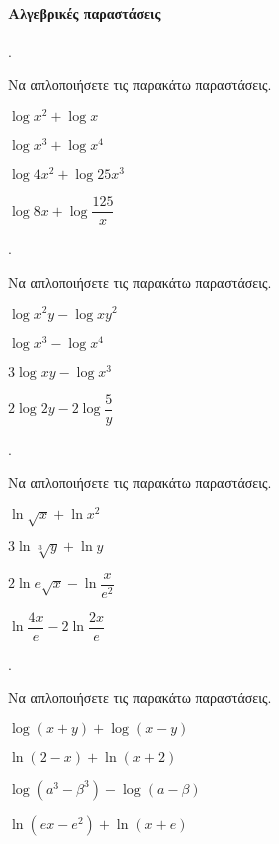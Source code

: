 \documentclass[11pt,a4paper,twocolumn]{article}
\newcounter{askhsh}
\newcommand{\askhsh}{{\large\theaskhsh.}\ \addtocounter{askhsh}{1}}
\begin{document}
\paragraph{Αλγεβρικές παραστάσεις}
\askhsh Να απλοποιήσετε τις παρακάτω παραστάσεις.
\begin{multicols}{2}
\begin{alist}
\item $ \log{x^2}+\log{x} $
\item $ \log{x^3}+\log{x^4} $
\item $ \log{4x^2}+\log{25x^3} $
\item $ \log{8x}+\log{\dfrac{125}{x}} $
\end{alist}
\end{multicols}
\askhsh Να απλοποιήσετε τις παρακάτω παραστάσεις.
\begin{multicols}{2}
\begin{alist}
\item $ \log{x^2y}-\log{xy^2} $
\item $ \log{x^3}-\log{x^4} $
\item $ 3\log{xy}-\log{x^3} $
\item $ 2\log{2y}-2\log{\dfrac{5}{y}} $
\end{alist}
\end{multicols}
\askhsh Να απλοποιήσετε τις παρακάτω παραστάσεις.
\begin{multicols}{2}
\begin{alist}
\item $ \ln{\sqrt{x}}+\ln{x^2} $
\item $ 3\ln{\sqrt[3]{y}}+\ln{y} $
\item $ 2\ln{e\sqrt{x}}-\ln{\dfrac{x}{e^2}} $
\item $ \ln{\dfrac{4x}{e}}-2\ln{\dfrac{2x}{e}} $
\end{alist}
\end{multicols}
\askhsh Να απλοποιήσετε τις παρακάτω παραστάσεις.
\begin{alist}
\item $ \log{(x+y)}+\log{(x-y)} $
\item $ \ln{(2-x)}+\ln{(x+2)} $
\item $ \log{\left( a^3-\beta^3\right) }-\log{(a-\beta)} $
\item $ \ln{(ex-e^2)}+\ln{(x+e)} $
\end{alist}
\end{document}
